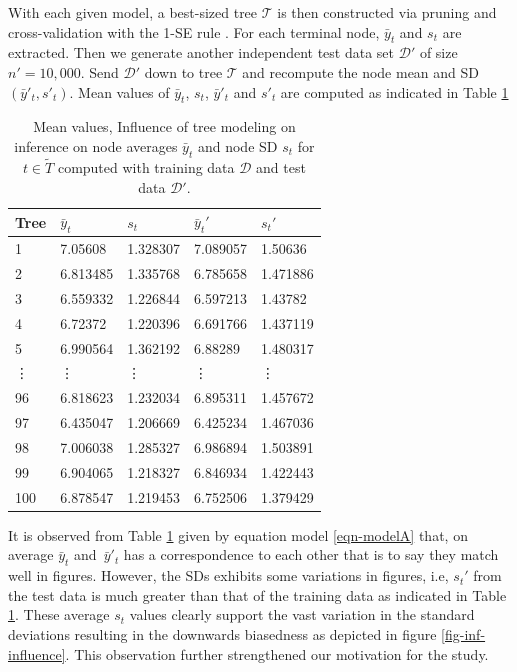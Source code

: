 With each given model, a best-sized tree $\mathcal{T}$ is then constructed via pruning and cross-validation with the 1-SE rule \citep{breiman1984classification}. For each terminal node, $\bar{y}_t$ and $s_t$ are extracted. Then we generate another independent test data set $\mathcal{D}'$ of size $n'=10,000.$ Send $\mathcal{D}'$ down to tree $\mathcal{T}$ and recompute the node mean and SD $(\bar{y}'_t, s'_t).$ Mean values of $\bar{y}_t$, $s_t$, $\bar{y}'_t$ and $s'_t$ are computed as indicated in Table \ref{table:1}

\vspace{0.1in}
\begin{table}[H]
\caption{ Mean values, Influence of tree modeling on inference on node averages $\bar{y}_t$ and node SD $s_t$ for $t \in \widetilde{T}$ computed with training data $\mathcal{D}$ and test data $\mathcal{D}'$. }
	\centering
\begin{tabular}{ |p{1cm}|p{3cm}|p{3cm}|p{3cm}| p{3cm}|}%
	\hline
	Tree   &$\bar{y}_{t}$ &$s_t$& $\bar{y}_{t}'$ & $s_t'$\\
	\hline
	1&	7.05608&	1.328307&	7.089057&	1.50636\\

	2&	6.813485&	1.335768&	6.785658&	1.471886\\

	3&	6.559332&	1.226844&	6.597213&	1.43782\\

	4&	6.72372&	1.220396&	6.691766&	1.437119\\

	5&	6.990564&	1.362192&	6.88289&	1.480317\\
	
	\vdots & \vdots & \vdots & \vdots & \vdots\\
	
	96&	6.818623&	1.232034&	6.895311&	1.457672
\\
	97&	6.435047&	1.206669&	6.425234&	1.467036
\\
	98&	7.006038&	1.285327&	6.986894&	1.503891
\\
	99&	6.904065&	1.218327&	6.846934&	1.422443
\\
	100	&6.878547&	1.219453&	6.752506&	1.379429\\
	\hline
\end{tabular}
\label{table:1}
\end{table}
It is observed from Table \ref{table:1} given by equation model \ref{eqn-modelA} that, on average $\bar{y}_t$ and~$\bar{y}'_t$ has a correspondence to each other that is to say they match well in figures. However, the SDs exhibits some variations in figures, i.e, $s_t'$ from the test data is much greater than that of the training data as indicated in Table \ref{table:1}. These average $s_t$ values clearly support the vast variation in the standard deviations resulting in the downwards biasedness as depicted in figure \ref{fig-inf-influence}. This observation further strengthened our motivation for the study.


